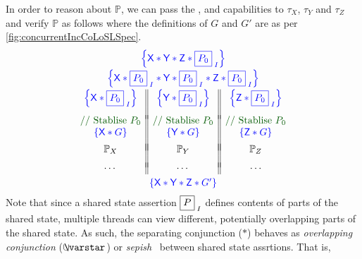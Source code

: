 In order to reason about $\mathbb{P}$, we can pass the ,  and  capabilities to $\tau_X$, $\tau_Y$ and $\tau_Z$ and verify $\mathbb{P}$ as follows where the definitions of $G$ and $G'$ are as per \fig\ref{fig:concurrentIncCoLoSLSpec}.
%
\[
\begin{array}{c}
	\color{blue}{\left\{\textsf{X} * \textsf{Y} *  \textsf{Z} *  \shared{P_0}{I} \right\}}\vspace*{2pt}\\
	
	\color{blue}{\left\{\textsf{X} * \shared{P_0}{I} * \textsf{Y} *  \shared{P_0}{I} * \textsf{Z} *  \shared{P_0}{I} \right\}}\vspace*{2pt}\\
	
	\begin{array}{c || c || c}
		\color{blue}{\left\{\textsf{X} * \shared{P_0}{I} \right\}} & \color{blue}{\left\{\textsf{Y} * \shared{P_0}{I} \right\}} & \color{blue}{\left\{\textsf{Z} * \shared{P_0}{I} \right\}}\\
		
		&&\vspace*{-4pt}\\
		
		\color{darkgreen}{\text{// Stablise } P_0} & \color{darkgreen}{\text{// Stablise } P_0} & \color{darkgreen}{\text{// Stablise } P_0}\\
		
		\color{blue}{\left\{\textsf{X} * G \right\}} & \color{blue}{\left\{\textsf{Y} * G \right\}} & \color{blue}{\left\{\textsf{Z} * G \right\}}\\
		&&\vspace*{-7pt}\\
		\mathbb{P}_X & \mathbb{P}_Y & \mathbb{P}_Z\\
		&&\vspace*{-5pt}\\
		\cdots & \cdots & \cdots
	\end{array}\vspace*{3pt}\\
	
	\color{blue}{\left\{\textsf{X} * \textsf{Y} *  \textsf{Z} *  G' \right\}}\\
\end{array}
\]
%
Note that since a shared state assertion $\shared{P}{I}$ defines contents of parts of the shared state, multiple threads can view different, potentially overlapping parts of the shared state. As such, the separating conjunction ($*$) behaves as \emph{overlapping conjunction} ($\sepish$) or \emph{sepish}~\cite{todo} between shared state assrtions. That is,
